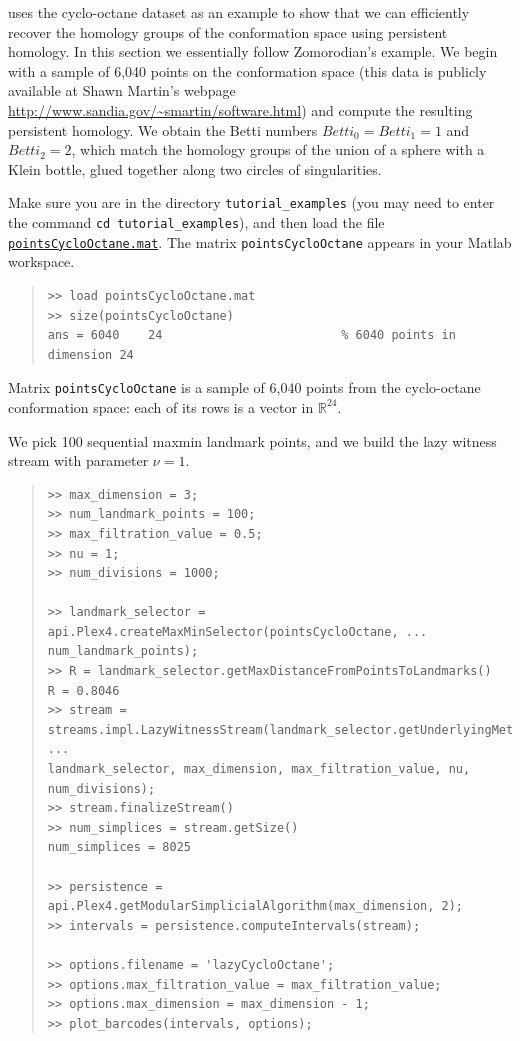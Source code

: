 \documentclass[amscd, amssymb, verbatim]{amsart}[12pt]
\theoremstyle{remark}
\theoremstyle{remark}
\theoremstyle{remark}
\newcommand{\R}{\mathbb{R}}
\begin{document}
\cite{zomorodian2012advances} uses the cyclo-octane dataset as an example to show that we can efficiently recover the homology groups of the conformation space using persistent homology. In this section we essentially follow Zomorodian's example. We begin with a sample of 6,040 points on the conformation space (this data is publicly available at Shawn Martin's webpage \url{http://www.sandia.gov/~smartin/software.html}) and compute the resulting persistent homology. We obtain the Betti numbers $Betti_0 = Betti_1 = 1$ and $Betti_2 = 2$, which match the homology groups of the union of a sphere with a Klein bottle, glued together along two circles of singularities.

Make sure you are in the directory \texttt{tutorial\_examples} (you may need to enter the command \texttt{cd tutorial\_examples}), and then load the file \href{https://github.com/appliedtopology/javaplex/tree/master/src/matlab/for_distribution/tutorial_examples/pointsCycloOctane.mat}{\texttt{pointsCycloOctane.mat}}. The matrix \texttt{pointsCycloOctane} appears in your Matlab workspace.

\begin{quote} \begin{verbatim}
>> load pointsCycloOctane.mat
>> size(pointsCycloOctane)
ans = 6040    24                         % 6040 points in dimension 24
\end{verbatim} \end{quote}

Matrix \texttt{pointsCycloOctane} is a sample of 6,040 points from the cyclo-octane conformation space: each of its rows is a vector in $\R^{24}$.

We pick 100 sequential maxmin landmark points, and we build the lazy witness stream with parameter $\nu = 1$. 

\begin{quote} \begin{verbatim}
>> max_dimension = 3;
>> num_landmark_points = 100;
>> max_filtration_value = 0.5;
>> nu = 1;
>> num_divisions = 1000;

>> landmark_selector = api.Plex4.createMaxMinSelector(pointsCycloOctane, ...
num_landmark_points);
>> R = landmark_selector.getMaxDistanceFromPointsToLandmarks() 
R = 0.8046
>> stream = streams.impl.LazyWitnessStream(landmark_selector.getUnderlyingMetricSpace(), ...
landmark_selector, max_dimension, max_filtration_value, nu, num_divisions);
>> stream.finalizeStream()
>> num_simplices = stream.getSize()
num_simplices = 8025                         

>> persistence = api.Plex4.getModularSimplicialAlgorithm(max_dimension, 2);
>> intervals = persistence.computeIntervals(stream);

>> options.filename = 'lazyCycloOctane';
>> options.max_filtration_value = max_filtration_value;
>> options.max_dimension = max_dimension - 1;
>> plot_barcodes(intervals, options);
\end{verbatim} \end{quote}
\end{document}
